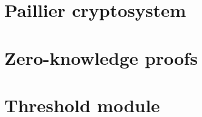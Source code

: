 \section{Paillier cryptosystem}
\lipsum[1-2]

\section{Zero-knowledge proofs}
\lipsum[1-2]

\section{Threshold module}
\lipsum[1-2]

%
